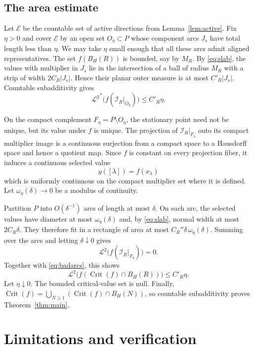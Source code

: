 \documentclass[11pt]{article}
\newcommand{\Crit}{\operatorname{Crit}}
\newcommand{\Leb}{\mathcal L^2}
\begin{document}
\subsection{The area estimate}

Let $\mathcal E$ be the countable set of active directions from
Lemma~\ref{lem:active}. Fix $\eta>0$ and cover $\mathcal E$ by an open set
$O_\eta\subset P$ whose
component arcs $J_s$ have total length less than $\eta$. We may take
$\eta$ small enough that all these arcs admit aligned representatives.
The set $f(B_H(R))$ is bounded, say by $M_R$. By \eqref{eq:slab}, the values
with multiplier in $J_s$ lie in the intersection of a ball of radius $M_R$
with a strip of width $2C_R|J_s|$. Hence their planar outer measure is at
most $C'_R|J_s|$. Countable subadditivity gives
\begin{equation}\label{eq:badarcs}
 {\Leb}^{*}\bigl(f(\mathcal I_R|_{O_\eta})\bigr)\leq C'_R\eta.
\end{equation}

On the compact complement $F_\eta=P\setminus O_\eta$, the stationary point
need not be unique, but its value under $f$ is unique. The projection of
$\mathcal I_R|_{F_\eta}$ onto its compact multiplier image is a continuous
surjection from a compact space to a Hausdorff space and hence a quotient map.
Since $f$ is constant on every projection fiber, it induces a continuous
selected value
\[
 y([\lambda])=f(x_\lambda)
\]
which is uniformly continuous on the compact multiplier set where it is
defined.
Let $\omega_\eta(\delta)\to0$ be a modulus of continuity.

Partition $P$ into $O(\delta^{-1})$ arcs of length at most $\delta$. On each
arc, the selected values have diameter at most $\omega_\eta(\delta)$ and, by
\eqref{eq:slab}, normal width at most $2C_R\delta$. They therefore fit in a
rectangle of area at most
$C_R''\delta\,\omega_\eta(\delta)$. Summing over the arcs and letting
$\delta\downarrow0$ gives
\[
 \Leb\bigl(f(\mathcal I_R|_{F_\eta})\bigr)=0.
\]
Together with \eqref{eq:badarcs}, this shows
\[
 \Leb\bigl(f(\Crit(f)\cap B_H(R))\bigr)\leq C'_R\eta.
\]
Let $\eta\downarrow0$. The bounded critical-value set is null. Finally,
$\Crit(f)=\bigcup_{N\geq1}(\Crit(f)\cap B_H(N))$, so countable subadditivity
proves Theorem~\ref{thm:main}.

\section{Limitations and verification}
\end{document}
